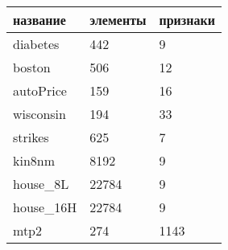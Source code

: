 \begin{tabular}{|l|l|l|}

\hline

название        & элементы  & признаки \\

\hline

diabetes        & 442    & 9     \\
boston          & 506    & 12    \\
autoPrice       & 159    & 16    \\
wisconsin       & 194    & 33    \\
strikes         & 625    & 7     \\
kin8nm          & 8192   & 9     \\
house\_8L       & 22784  & 9     \\
house\_16H      & 22784  & 9     \\
mtp2            & 274    & 1143  \\

\hline

\end{tabular}
